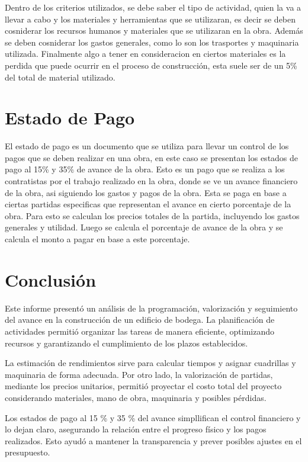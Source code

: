\documentclass{article} %
\begin{document}
Dentro de los criterios utilizados, se debe saber el tipo de actividad, quien la va a llevar a cabo y los materiales y herramientas que se utilizaran, es decir se deben cosniderar los recursos humanos y materiales que se utilizaran en la obra. Además se deben cosniderar los gastos generales, como lo son los trasportes y maquinaria utilizada. Finalmente algo a tener en consideracion en ciertos materiales es la perdida que puede ocurrir en el proceso de construcción, esta suele ser de un 5\% del total de material utilizado.

\section{Estado de Pago}

El estado de pago es un documento que se utiliza para llevar un control de los pagos que se deben realizar en una obra, en este caso se presentan los estados de pago al 15\% y 35\% de avance de la obra. Esto es un pago que se realiza a los contratistas por el trabajo realizado en la obra, donde se ve un avance financiero de la obra, asi siguiendo los gastos y pagos de la obra. Esta se paga en base a ciertas partidas especificas que representan el avance en cierto porcentaje de la obra. Para esto se calculan los precios totales de la partida, incluyendo los gastos generales y utilidad. Luego se calcula el porcentaje de avance de la obra y se calcula el monto a pagar en base a este porcentaje.

\newpage
\section{Conclusión}

Este informe presentó un análisis de la programación, valorización y seguimiento del avance en la construcción de un edificio de bodega. La planificación de actividades permitió organizar las tareas de manera eficiente, optimizando recursos y garantizando el cumplimiento de los plazos establecidos.

La estimación de rendimientos sirve para calcular tiempos y asignar cuadrillas y maquinaria de forma adecuada. Por otro lado, la valorización de partidas, mediante los precios unitarios, permitió proyectar el costo total del proyecto considerando materiales, mano de obra, maquinaria y posibles pérdidas.

Los estados de pago al 15 \% y 35 \% del avance simpllifican el control financiero y lo dejan claro, asegurando la relación entre el progreso físico y los pagos realizados. Esto ayudó a mantener la transparencia y prever posibles ajustes en el presupuesto.
\end{document}
